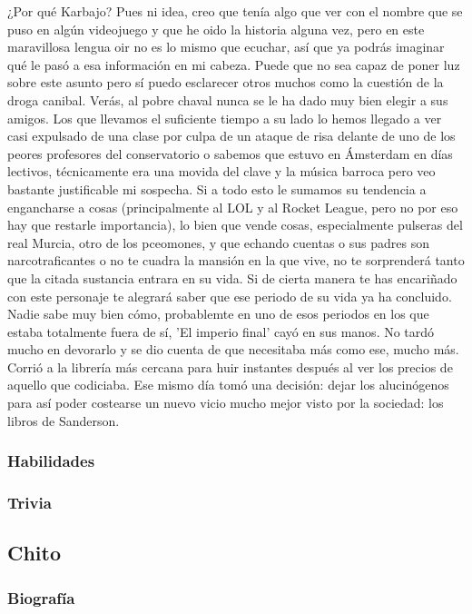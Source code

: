 \documentclass[letterpaper]{article}
\begin{document}
¿Por qué Karbajo? Pues ni idea, creo que tenía algo que ver con el nombre que se puso en algún videojuego y que he oido la historia alguna vez, pero en este
maravillosa lengua oir no es lo mismo que ecuchar, así que ya podrás imaginar qué le pasó a esa información en mi cabeza. Puede que no sea capaz de poner luz sobre
este  asunto pero sí puedo esclarecer otros muchos como la cuestión de la droga canibal. Verás, al pobre chaval nunca se le ha dado muy bien elegir a sus amigos.
Los que llevamos  el suficiente tiempo a su lado lo hemos llegado a ver casi expulsado de una clase por culpa de un ataque de risa delante de uno de los peores
profesores del conservatorio o sabemos que estuvo en Ámsterdam en días lectivos, técnicamente era una movida del clave y la música barroca pero veo bastante
justificable mi sospecha. Si a todo esto le sumamos su tendencia a engancharse a cosas (principalmente al LOL y al Rocket League, pero no por eso hay que restarle
importancia), lo bien que vende cosas, especialmente pulseras del real Murcia, otro de los pceomones, y que echando cuentas o sus padres son narcotraficantes o no
te cuadra la mansión en la que vive, no te sorprenderá tanto que la citada sustancia entrara  en su vida. Si de cierta manera te has encariñado con este personaje
te alegrará saber que ese periodo de su vida ya ha concluido. Nadie sabe muy bien cómo, probablemte en uno de esos periodos en los que estaba totalmente fuera de
sí, 'El imperio final' cayó en sus manos. No tardó mucho en devorarlo y se dio cuenta de que necesitaba más como ese, mucho más. Corrió a la librería más cercana
para huir instantes después al ver los precios de aquello que codiciaba. Ese mismo día tomó una decisión: dejar los alucinógenos para así poder costearse un nuevo
vicio mucho mejor visto por la sociedad: los libros de Sanderson.\\


\subsubsection{Habilidades}

\subsubsection{Trivia}

\subsection{Chito}

\subsubsection{Biografía}
\end{document}
